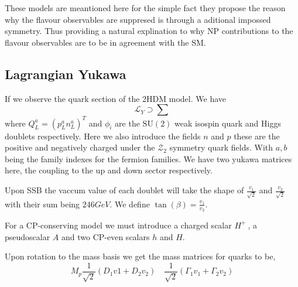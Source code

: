 These models are meantioned here for the simple fact they propose the reason why the flavour observables are suppresed is through a aditional impossed symmetry. Thus providing a natural explination to why NP contributions to the flavour observables are to be in agreement with the SM. 

\subsection{Lagrangian Yukawa}

If we observe the quark section of the 2HDM model. We have 
%
\begin{equation}
\mathcal{L}_Y \supset \sum
\end{equation}
%
where $Q^a_L = \left( p^a_L n^a_L \right)^T$ and $\phi_i$ are the $\mathrm{SU(2)}$ weak isospin quark and Higgs doublets respectively. Here we also introduce the fields $n$ and $p$ these are the positive and negatively charged  under the $\mathcal{Z}_2$ symmetry quark fields. With $a,b$ being the family indexes for the fermion families. We have two yukawa matrices here, the coupling to the up and down sector respectively. 

Upon SSB the vaccum value of each doublet will take the shape of $\frac{v_1}{\sqrt{2}}$ and $\frac{v_2}{\sqrt{2}}$ with their sum being $246 GeV$. We define $\tan(\beta)=\frac{v_1}{v_2}$.

For a CP-conserving model we must introduce a charged scalar $H^+~$, a pseudoscalar $A$ and two CP-even scalars $h$ and $H$.  

Upon rotation to the mass basis we get the mass matrices for quarks to be, 
\begin{equation}
M_p \frac{1}{\sqrt{2}} \left( D_1 v1 + D_2 v_2 \right) \quad \frac{1}{\sqrt{2}}\left( \Gamma_1 v_1 + \Gamma_2 v_2 \right)   
\end{equation}

